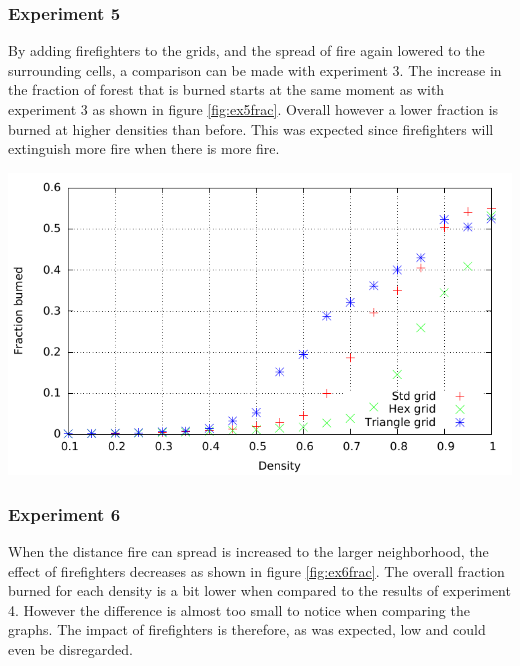 \documentclass{article}
\newenvironment{Figure}
  {\par\medskip\noindent\minipage{\linewidth}}
  {\endminipage\par\medskip}
\begin{document}
\begin{multicols}{2}
\subsubsection*{Experiment 5}
By adding firefighters to the grids, and the spread of fire again lowered to the surrounding cells, a comparison can be made with experiment 3. The increase in the fraction of forest that is burned starts at the same moment as with experiment 3 as shown in figure \ref{fig:ex5frac}. Overall however a lower fraction is burned at higher densities than before. This was expected since firefighters will extinguish more fire when there is more fire.

\begin{Figure}
 \centering
 \includegraphics[width=\textwidth]{imgs/plot/ex5/fracburned.pdf}
\label{fig:ex5frac}
\end{Figure}
\subsubsection*{Experiment 6}
When the distance fire can spread is increased to the larger neighborhood, the effect of firefighters decreases as shown in figure \ref{fig:ex6frac}. The overall fraction burned for each density is a bit lower when compared to the results of experiment 4. However the difference is almost too small to notice when comparing the graphs. The impact of firefighters is therefore, as was expected, low and could even be disregarded.


\end{multicols}
\end{document}
